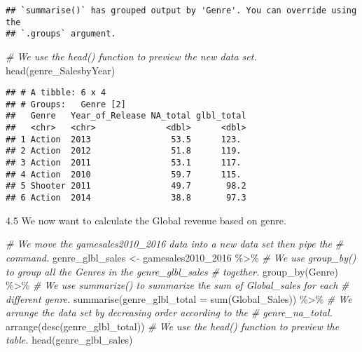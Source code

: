 \documentclass[
]{article}
\newenvironment{Shaded}{\begin{snugshade}}{\end{snugshade}}
\newcommand{\AttributeTok}[1]{\textcolor[rgb]{0.77,0.63,0.00}{#1}}
\newcommand{\CommentTok}[1]{\textcolor[rgb]{0.56,0.35,0.01}{\textit{#1}}}
\newcommand{\FunctionTok}[1]{\textcolor[rgb]{0.00,0.00,0.00}{#1}}
\newcommand{\NormalTok}[1]{#1}
\newcommand{\OtherTok}[1]{\textcolor[rgb]{0.56,0.35,0.01}{#1}}
\newcommand{\SpecialCharTok}[1]{\textcolor[rgb]{0.00,0.00,0.00}{#1}}
\begin{document}
\begin{verbatim}
## `summarise()` has grouped output by 'Genre'. You can override using the
## `.groups` argument.
\end{verbatim}

\begin{Shaded}
\begin{Highlighting}[]
\CommentTok{\# We use the head() function to preview the new data set.}
\FunctionTok{head}\NormalTok{(genre\_SalesbyYear)}
\end{Highlighting}
\end{Shaded}

\begin{verbatim}
## # A tibble: 6 x 4
## # Groups:   Genre [2]
##   Genre   Year_of_Release NA_total glbl_total
##   <chr>   <chr>              <dbl>      <dbl>
## 1 Action  2013                53.5      123. 
## 2 Action  2012                51.8      119. 
## 3 Action  2011                53.1      117. 
## 4 Action  2010                59.7      115. 
## 5 Shooter 2011                49.7       98.2
## 6 Action  2014                38.8       97.3
\end{verbatim}

4.5 We now want to calculate the Global revenue based on genre.

\begin{Shaded}
\begin{Highlighting}[]
\CommentTok{\# We move the gamesales2010\_2016 data into a new data set then pipe the}
\CommentTok{\# command.}
\NormalTok{genre\_glbl\_sales }\OtherTok{\textless{}{-}}\NormalTok{ gamesales2010\_2016 }\SpecialCharTok{\%\textgreater{}\%}
    \CommentTok{\# We use group\_by() to group all the Genres in the genre\_glbl\_sales}
    \CommentTok{\# together.}
\FunctionTok{group\_by}\NormalTok{(Genre) }\SpecialCharTok{\%\textgreater{}\%}
    \CommentTok{\# We use summarize() to summarize the sum of Global\_sales for each}
    \CommentTok{\# different genre.}
\FunctionTok{summarise}\NormalTok{(}\AttributeTok{genre\_glbl\_total =} \FunctionTok{sum}\NormalTok{(Global\_Sales)) }\SpecialCharTok{\%\textgreater{}\%}
    \CommentTok{\# We arrange the data set by decreasing order according to the}
    \CommentTok{\# genre\_na\_total.}
\FunctionTok{arrange}\NormalTok{(}\FunctionTok{desc}\NormalTok{(genre\_glbl\_total))}
\CommentTok{\# We use the head() function to preview the table.}
\FunctionTok{head}\NormalTok{(genre\_glbl\_sales)}
\end{Highlighting}
\end{Shaded}
\end{document}
